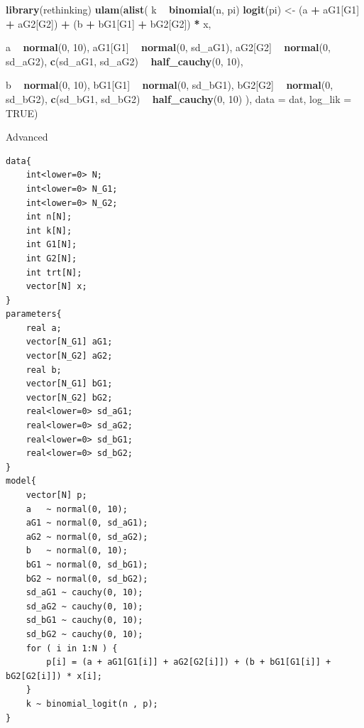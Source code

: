 \documentclass[11pt, oneside, openany]{scrbook}
\newenvironment{Shaded}{\begin{snugshade}}{\end{snugshade}}
\newcommand{\DataTypeTok}[1]{\textcolor[rgb]{0.13,0.29,0.53}{#1}}
\newcommand{\DecValTok}[1]{\textcolor[rgb]{0.00,0.00,0.81}{#1}}
\newcommand{\KeywordTok}[1]{\textcolor[rgb]{0.13,0.29,0.53}{\textbf{#1}}}
\newcommand{\NormalTok}[1]{#1}
\newcommand{\OperatorTok}[1]{\textcolor[rgb]{0.81,0.36,0.00}{\textbf{#1}}}
\newcommand{\OtherTok}[1]{\textcolor[rgb]{0.56,0.35,0.01}{#1}}
\newcommand{\StringTok}[1]{\textcolor[rgb]{0.31,0.60,0.02}{#1}}
\begin{document}
\begin{Shaded}
\begin{Highlighting}[]
\KeywordTok{library}\NormalTok{(rethinking)}
\KeywordTok{ulam}\NormalTok{(}\KeywordTok{alist}\NormalTok{(}
\NormalTok{  k }\OperatorTok{~}\StringTok{ }\KeywordTok{binomial}\NormalTok{(n, pi)}
  \KeywordTok{logit}\NormalTok{(pi) <-}\StringTok{ }\NormalTok{(a }\OperatorTok{+}\StringTok{ }\NormalTok{aG1[G1] }\OperatorTok{+}\StringTok{ }\NormalTok{aG2[G2]) }\OperatorTok{+}\StringTok{ }\NormalTok{(b }\OperatorTok{+}\StringTok{ }\NormalTok{bG1[G1] }\OperatorTok{+}\StringTok{ }\NormalTok{bG2[G2]) }\OperatorTok{*}\StringTok{ }\NormalTok{x,}
  
\NormalTok{  a }\OperatorTok{~}\StringTok{ }\KeywordTok{normal}\NormalTok{(}\DecValTok{0}\NormalTok{, }\DecValTok{10}\NormalTok{),}
\NormalTok{  aG1[G1] }\OperatorTok{~}\StringTok{ }\KeywordTok{normal}\NormalTok{(}\DecValTok{0}\NormalTok{, sd_aG1),}
\NormalTok{  aG2[G2] }\OperatorTok{~}\StringTok{ }\KeywordTok{normal}\NormalTok{(}\DecValTok{0}\NormalTok{, sd_aG2),}
  \KeywordTok{c}\NormalTok{(sd_aG1, sd_aG2) }\OperatorTok{~}\StringTok{ }\KeywordTok{half_cauchy}\NormalTok{(}\DecValTok{0}\NormalTok{, }\DecValTok{10}\NormalTok{),}

\NormalTok{  b }\OperatorTok{~}\StringTok{ }\KeywordTok{normal}\NormalTok{(}\DecValTok{0}\NormalTok{, }\DecValTok{10}\NormalTok{),}
\NormalTok{  bG1[G1] }\OperatorTok{~}\StringTok{ }\KeywordTok{normal}\NormalTok{(}\DecValTok{0}\NormalTok{, sd_bG1),}
\NormalTok{  bG2[G2] }\OperatorTok{~}\StringTok{ }\KeywordTok{normal}\NormalTok{(}\DecValTok{0}\NormalTok{, sd_bG2),}
  \KeywordTok{c}\NormalTok{(sd_bG1, sd_bG2) }\OperatorTok{~}\StringTok{ }\KeywordTok{half_cauchy}\NormalTok{(}\DecValTok{0}\NormalTok{, }\DecValTok{10}\NormalTok{)}
\NormalTok{), }\DataTypeTok{data =}\NormalTok{ dat, }\DataTypeTok{log_lik =} \OtherTok{TRUE}\NormalTok{)}
\end{Highlighting}
\end{Shaded}


Advanced


\begin{verbatim}
data{
    int<lower=0> N;
    int<lower=0> N_G1;
    int<lower=0> N_G2;
    int n[N];
    int k[N];
    int G1[N];
    int G2[N];
    int trt[N];
    vector[N] x;
}
parameters{
    real a;
    vector[N_G1] aG1;
    vector[N_G2] aG2;
    real b;
    vector[N_G1] bG1;
    vector[N_G2] bG2;
    real<lower=0> sd_aG1;
    real<lower=0> sd_aG2;
    real<lower=0> sd_bG1;
    real<lower=0> sd_bG2;
}
model{
    vector[N] p;
    a   ~ normal(0, 10);
    aG1 ~ normal(0, sd_aG1);
    aG2 ~ normal(0, sd_aG2);
    b   ~ normal(0, 10);
    bG1 ~ normal(0, sd_bG1);
    bG2 ~ normal(0, sd_bG2);
    sd_aG1 ~ cauchy(0, 10);
    sd_aG2 ~ cauchy(0, 10);
    sd_bG1 ~ cauchy(0, 10);
    sd_bG2 ~ cauchy(0, 10);
    for ( i in 1:N ) {
        p[i] = (a + aG1[G1[i]] + aG2[G2[i]]) + (b + bG1[G1[i]] + bG2[G2[i]]) * x[i];
    }
    k ~ binomial_logit(n , p);
}
\end{verbatim}
\end{document}
